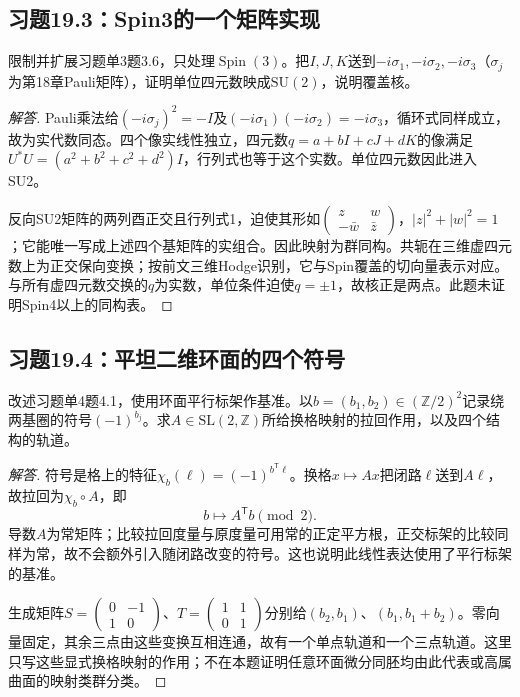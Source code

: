 \subsection*{习题19.3：Spin3的一个矩阵实现}
限制并扩展习题单3题3.6，只处理$\operatorname{Spin}(3)$。把$I,J,K$送到$-i\sigma_1,-i\sigma_2,-i\sigma_3$（$\sigma_j$为第18章Pauli矩阵），证明单位四元数映成$\mathrm{SU}(2)$，说明覆盖核。
\begin{proof}[解答]
Pauli乘法给$(-i\sigma_j)^2=-I$及$(-i\sigma_1)(-i\sigma_2)=-i\sigma_3$，循环式同样成立，故为实代数同态。四个像实线性独立，四元数$q=a+bI+cJ+dK$的像满足$U^*U=(a^2+b^2+c^2+d^2)I$，行列式也等于这个实数。单位四元数因此进入SU2。

反向SU2矩阵的两列酉正交且行列式1，迫使其形如$\left(\begin{smallmatrix}z&w\\-\bar w&\bar z\end{smallmatrix}\right)$，$|z|^2+|w|^2=1$；它能唯一写成上述四个基矩阵的实组合。因此映射为群同构。共轭在三维虚四元数上为正交保向变换；按前文三维Hodge识别，它与Spin覆盖的切向量表示对应。与所有虚四元数交换的$q$为实数，单位条件迫使$q=\pm1$，故核正是两点。此题未证明Spin4以上的同构表。
\end{proof}

\subsection*{习题19.4：平坦二维环面的四个符号}
改述习题单4题4.1，使用环面平行标架作基准。以$b=(b_1,b_2)\in(\mathbb Z/2)^2$记录绕两基圈的符号$(-1)^{b_j}$。求$A\in\mathrm{SL}(2,\mathbb Z)$所给换格映射的拉回作用，以及四个结构的轨道。
\begin{proof}[解答]
符号是格上的特征$\chi_b(\ell)=(-1)^{b^{\mathsf T}\ell}$。换格$x\mapsto Ax$把闭路$\ell$送到$A\ell$，故拉回为$\chi_b\circ A$，即
\[
 b\longmapsto A^{\mathsf T}b\pmod2.
\]
导数$A$为常矩阵；比较拉回度量与原度量可用常的正定平方根，正交标架的比较同样为常，故不会额外引入随闭路改变的符号。这也说明此线性表达使用了平行标架的基准。

生成矩阵$S=\left(\begin{smallmatrix}0&-1\\1&0\end{smallmatrix}\right)$、$T=\left(\begin{smallmatrix}1&1\\0&1\end{smallmatrix}\right)$分别给$(b_2,b_1)$、$(b_1,b_1+b_2)$。零向量固定，其余三点由这些变换互相连通，故有一个单点轨道和一个三点轨道。这里只写这些显式换格映射的作用；不在本题证明任意环面微分同胚均由此代表或高属曲面的映射类群分类。
\end{proof}

